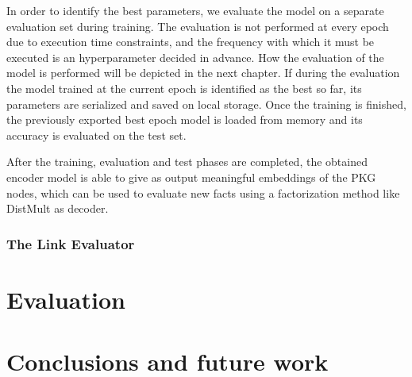 \documentclass[%
    corpo=13.5pt,
    twoside,
    oldstyle,
    tipotesi=magistrale,
    greek,
    evenboxes
]{toptesi}
\begin{document}
In order to identify the best parameters, we evaluate the model on a separate
evaluation set during training.
The evaluation is not performed at
every epoch due to execution time constraints, and the frequency with which it
must be executed is an hyperparameter decided in advance.
How the evaluation of the model is performed will be depicted in the next
chapter.
If during the evaluation the model trained at the current epoch is identified
as the best so far, its parameters are serialized and saved on local storage.
Once the training is finished, the previously exported best epoch model is
loaded from memory and its accuracy is evaluated on the test set.

After the training, evaluation and test phases are completed, the obtained
encoder model is able to give as output meaningful embeddings of the PKG nodes,
which can be used to evaluate new facts using a factorization method
like DistMult as decoder.



\subsection{The Link Evaluator}



\chapter{Evaluation}




\chapter{Conclusions and future work}





\end{document}
